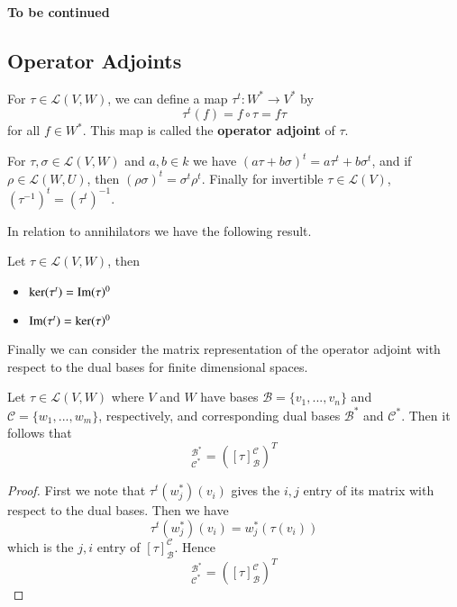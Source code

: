 \textbf{To be continued}

\subsection{Operator Adjoints}

For $\tau \in \mathcal{L}(V,W)$, we can define a map $\tau^t:W^*\rightarrow V^*$ by \begin{equation*}
    \tau^t(f) = f\circ \tau = f\tau
\end{equation*}
for all $f \in W^*$. This map is called the \textbf{operator adjoint} of $\tau$.

\begin{theorem}
    For $\tau,\sigma \in \mathcal{L}(V,W)$ and $a,b \in k$ we have $(a\tau+b\sigma)^t = a\tau^t+b\sigma^t$, and if $\rho\in \mathcal{L}(W,U)$, then $(\rho\sigma)^t = \sigma^t\rho^t$. Finally for invertible $\tau \in \mathcal{L}(V)$, $(\tau^{-1})^t = (\tau^t)^{-1}$.
\end{theorem}

In relation to annihilators we have the following result.

\begin{theorem}
    Let $\tau \in \mathcal{L}(V,W)$, then \begin{itemize}
        \item $\ker(\tau^t) = \operatorname{Im}(\tau)^0$
        \item $\operatorname{Im}(\tau^t) = \ker(\tau)^0$
    \end{itemize}
\end{theorem}

Finally we can consider the matrix representation of the operator adjoint with respect to the dual bases for finite dimensional spaces.

\begin{theorem}
    Let $\tau \in \mathcal{L}(V,W)$ where $V$ and $W$ have bases $\mathcal{B} = \{v_1,...,v_n\}$ and $\mathcal{C} = \{w_1,...,w_m\}$, respectively, and corresponding dual bases $\mathcal{B}^*$ and $\mathcal{C}^*$. Then it follows that \begin{equation*}
        [\tau^t]_{\mathcal{C}^*}^{\mathcal{B}^*} = ([\tau]_{\mathcal{B}}^{\mathcal{C}})^T
    \end{equation*}
\end{theorem}
\begin{proof}
    First we note that $\tau^t(w_j^*)(v_i)$ gives the $i,j$ entry of its matrix with respect to the dual bases. Then we have \begin{equation*}
        \tau^t(w_j^*)(v_i) = w_j^*(\tau(v_i))
    \end{equation*}
    which is the $j,i$ entry of $[\tau]_{\mathcal{B}}^{\mathcal{C}}$. Hence \begin{equation*}
        [\tau^t]_{\mathcal{C}^*}^{\mathcal{B}^*} = ([\tau]_{\mathcal{B}}^{\mathcal{C}})^T
    \end{equation*}
\end{proof}



